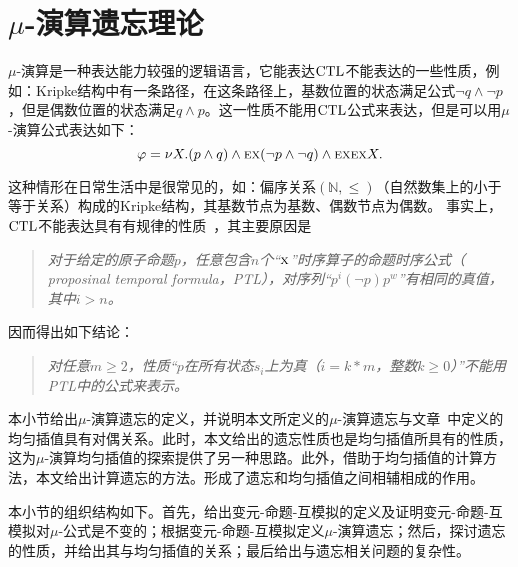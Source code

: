 \section{$\mu$-演算遗忘理论}
\label{chapter03:sec:muforget}
$\mu$-演算是一种表达能力较强的逻辑语言，它能表达$\textrm{CTL}$不能表达的一些性质，例如：Kripke结构中有一条路径，在这条路径上，基数位置的状态满足公式$\neg q \wedge \neg p$，但是偶数位置的状态满足$q \wedge p$。这一性质不能用$\textrm{CTL}$公式来表达，但是可以用$\mu$-演算公式表达如下：
$$\varphi = \nu X.(p \wedge q) \wedge \textsc{e} \textsc{x}(\neg p \wedge \neg q) \wedge \textsc{e} \textsc{x} \textsc{e} \textsc{x} X.$$

这种情形在日常生活中是很常见的，如：偏序关系$(\mathbb{N}, \leq)$（自然数集上的小于等于关系）构成的Kripke结构，其基数节点为基数、偶数节点为偶数。
事实上，$\textrm{CTL}$不能表达具有有规律的性质~\cite{DBLP:journals/iandc/Wolper83}，其主要原因是
\begin{quote}
	\emph{对于给定的原子命题$p$，任意包含$n$个“$\textsc{x}$”时序算子的命题时序公式（ proposinal temporal formula，PTL），对序列“$p^i(\neg p) p^w$”有相同的真值，其中$i > n$。%
	}
\end{quote}

因而得出如下结论：
\begin{quote}
	\emph{对任意$m\geq 2$，性质“$p$在所有状态$s_i$上为真（$i = k*m$，整数$k\geq 0$）”不能用PTL中的公式来表示。
	}
\end{quote}





本小节给出$\mu$-演算遗忘的定义，并说明本文所定义的$\mu$-演算遗忘与文章~\cite{d2006modal}中定义的均匀插值具有对偶关系。此时，本文给出的遗忘性质也是均匀插值所具有的性质，这为$\mu$-演算均匀插值的探索提供了另一种思路。此外，借助于均匀插值的计算方法，本文给出计算遗忘的方法。形成了遗忘和均匀插值之间相辅相成的作用。

本小节的组织结构如下。首先，给出变元-命题-互模拟的定义及证明变元-命题-互模拟对$\mu$-公式是不变的；根据变元-命题-互模拟定义$\mu$-演算遗忘；然后，探讨遗忘的性质，并给出其与均匀插值的关系；最后给出与遗忘相关问题的复杂性。


